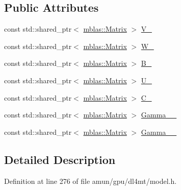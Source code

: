 \subsection*{Public Attributes}
\begin{DoxyCompactItemize}
\item 
const std\+::shared\+\_\+ptr$<$ \hyperlink{namespaceamunmt_1_1GPU_1_1mblas_ab67821a8254de53e45a623cf73c0aef6}{mblas\+::\+Matrix} $>$ \hyperlink{structamunmt_1_1GPU_1_1Weights_1_1DecAlignment_a9af90c7f1194d739a6f015e8d93fb109}{V\+\_\+}
\item 
const std\+::shared\+\_\+ptr$<$ \hyperlink{namespaceamunmt_1_1GPU_1_1mblas_ab67821a8254de53e45a623cf73c0aef6}{mblas\+::\+Matrix} $>$ \hyperlink{structamunmt_1_1GPU_1_1Weights_1_1DecAlignment_a7fe1c5f67b1350cde0dd5ab80120dbe1}{W\+\_\+}
\item 
const std\+::shared\+\_\+ptr$<$ \hyperlink{namespaceamunmt_1_1GPU_1_1mblas_ab67821a8254de53e45a623cf73c0aef6}{mblas\+::\+Matrix} $>$ \hyperlink{structamunmt_1_1GPU_1_1Weights_1_1DecAlignment_a7f9979c53d53138f6806e3934e576db3}{B\+\_\+}
\item 
const std\+::shared\+\_\+ptr$<$ \hyperlink{namespaceamunmt_1_1GPU_1_1mblas_ab67821a8254de53e45a623cf73c0aef6}{mblas\+::\+Matrix} $>$ \hyperlink{structamunmt_1_1GPU_1_1Weights_1_1DecAlignment_a7e119604736681821ea48cbc50154511}{U\+\_\+}
\item 
const std\+::shared\+\_\+ptr$<$ \hyperlink{namespaceamunmt_1_1GPU_1_1mblas_ab67821a8254de53e45a623cf73c0aef6}{mblas\+::\+Matrix} $>$ \hyperlink{structamunmt_1_1GPU_1_1Weights_1_1DecAlignment_a3952c253436d75dc9e4ffedc1084eae9}{C\+\_\+}
\item 
const std\+::shared\+\_\+ptr$<$ \hyperlink{namespaceamunmt_1_1GPU_1_1mblas_ab67821a8254de53e45a623cf73c0aef6}{mblas\+::\+Matrix} $>$ \hyperlink{structamunmt_1_1GPU_1_1Weights_1_1DecAlignment_ad3ae4a95e58488e0ec98a85c0d119d5f}{Gamma\+\_\+\_\+}
\item 
const std\+::shared\+\_\+ptr$<$ \hyperlink{namespaceamunmt_1_1GPU_1_1mblas_ab67821a8254de53e45a623cf73c0aef6}{mblas\+::\+Matrix} $>$ \hyperlink{structamunmt_1_1GPU_1_1Weights_1_1DecAlignment_abdca6855824dfda07fe9c2d49c1e9a5e}{Gamma\+\_\+\_\+}
\end{DoxyCompactItemize}


\subsection{Detailed Description}


Definition at line 276 of file amun/gpu/dl4mt/model.\+h.



